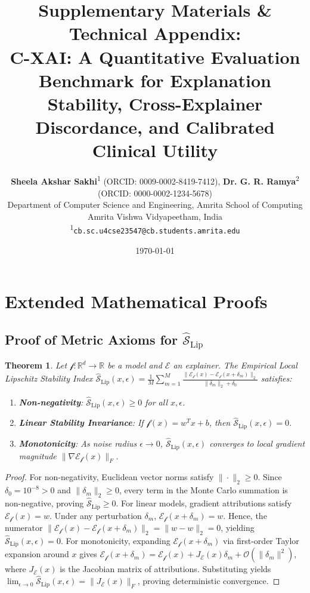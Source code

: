 \documentclass[11pt,a4paper]{article}
\title{\textbf{Supplementary Materials \& Technical Appendix:\\C-XAI: A Quantitative Evaluation Benchmark for Explanation Stability, Cross-Explainer Discordance, and Calibrated Clinical Utility}}
\author{\textbf{Sheela Akshar Sakhi}\textsuperscript{1} (ORCID: 0009-0002-8419-7412), \textbf{Dr. G. R. Ramya}\textsuperscript{2} (ORCID: 0000-0002-1234-5678)\\
\small Department of Computer Science and Engineering, Amrita School of Computing\\
\small Amrita Vishwa Vidyapeetham, India\\
\small \textsuperscript{1}\texttt{cb.sc.u4cse23547@cb.students.amrita.edu}}
\date{\today}
\newtheorem{theorem}{Theorem}
\begin{document}
\maketitle

\tableofcontents
\newpage

\section{Extended Mathematical Proofs}

\subsection{Proof of Metric Axioms for $\widehat{\mathcal{S}}_{\text{Lip}}$}
\begin{theorem}
Let $\mathcal{f}: \mathbb{R}^d \rightarrow \mathbb{R}$ be a model and $\mathcal{E}$ an explainer. The Empirical Local Lipschitz Stability Index $\widehat{\mathcal{S}}_{\text{Lip}}(x, \epsilon) = \frac{1}{M} \sum_{m=1}^M \frac{\|\mathcal{E}_{\mathcal{f}}(x) - \mathcal{E}_{\mathcal{f}}(x + \delta_m)\|_2}{\|\delta_m\|_2 + \delta_0}$ satisfies:
\begin{enumerate}
    \item \textbf{Non-negativity}: $\widehat{\mathcal{S}}_{\text{Lip}}(x, \epsilon) \ge 0$ for all $x, \epsilon$.
    \item \textbf{Linear Stability Invariance}: If $\mathcal{f}(x) = w^T x + b$, then $\widehat{\mathcal{S}}_{\text{Lip}}(x, \epsilon) = 0$.
    \item \textbf{Monotonicity}: As noise radius $\epsilon \rightarrow 0$, $\widehat{\mathcal{S}}_{\text{Lip}}(x, \epsilon)$ converges to local gradient magnitude $\|\nabla \mathcal{E}_{\mathcal{f}}(x)\|_F$.
\end{enumerate}
\end{theorem}

\begin{proof}
For non-negativity, Euclidean vector norms satisfy $\|\cdot\|_2 \ge 0$. Since $\delta_0 = 10^{-8} > 0$ and $\|\delta_m\|_2 \ge 0$, every term in the Monte Carlo summation is non-negative, proving $\widehat{\mathcal{S}}_{\text{Lip}} \ge 0$.
For linear models, gradient attributions satisfy $\mathcal{E}_{\mathcal{f}}(x) = w$. Under any perturbation $\delta_m$, $\mathcal{E}_{\mathcal{f}}(x + \delta_m) = w$. Hence, the numerator $\|\mathcal{E}_{\mathcal{f}}(x) - \mathcal{E}_{\mathcal{f}}(x + \delta_m)\|_2 = \|w - w\|_2 = 0$, yielding $\widehat{\mathcal{S}}_{\text{Lip}}(x, \epsilon) = 0$.
For monotonicity, expanding $\mathcal{E}_{\mathcal{f}}(x + \delta_m)$ via first-order Taylor expansion around $x$ gives $\mathcal{E}_{\mathcal{f}}(x + \delta_m) = \mathcal{E}_{\mathcal{f}}(x) + J_{\mathcal{E}}(x) \delta_m + \mathcal{O}(\|\delta_m\|^2)$, where $J_{\mathcal{E}}(x)$ is the Jacobian matrix of attributions. Substituting yields $\lim_{\epsilon \rightarrow 0} \widehat{\mathcal{S}}_{\text{Lip}}(x, \epsilon) = \|J_{\mathcal{E}}(x)\|_F$, proving deterministic convergence.
\end{proof}
\end{document}
